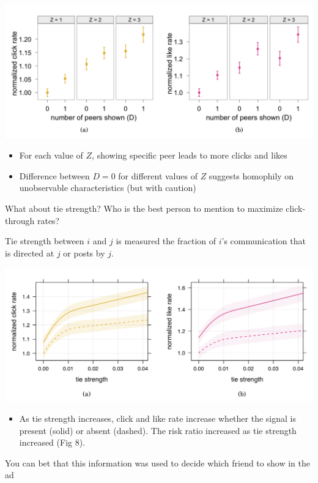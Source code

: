 \documentclass[aspectratio=169]{beamer}
\begin{document}
\begin{frame}

\begin{center}
\includegraphics[width=\textwidth]{figures/bakshy_social_2012_fig5}
\end{center}

\vfill
\begin{itemize}
\item For each value of $Z$, showing specific peer leads to more clicks and likes
\item Difference between $D=0$ for different values of $Z$ suggests homophily on unobservable characteristics (but with caution)
\end{itemize}



\end{frame}
\begin{frame}

What about tie strength?  Who is the best person to mention to maximize click-through rates?

Tie strength between $i$ and $j$ is measured the fraction of $i$'s communication that is directed at $j$ or posts by $j$.

\end{frame}
\begin{frame}

\begin{center}
\includegraphics[width=\textwidth]{figures/bakshy_social_2012_fig7}
\end{center}

\vfill
\begin{itemize}
\item As tie strength increases, click and like rate increase whether the signal is present (solid) or absent (dashed). The risk ratio increased as tie strength increased (Fig 8).
\end{itemize}

You can bet that this information was used to decide which friend to show in the ad
\end{frame}
\end{document}
